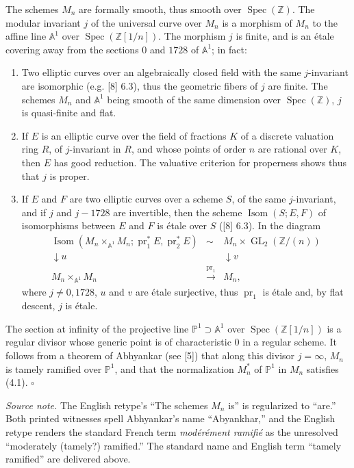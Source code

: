 \documentclass[10pt]{article}
\newcommand{\Z}{\mathbb Z}
\newcommand{\GL}{\operatorname{GL}}
\newcommand{\Isom}{\operatorname{Isom}}
\newcommand{\Spec}{\operatorname{Spec}}
\newcommand{\QED}{\hfill$\square$}
\begin{document}
The schemes $M_n$ are formally smooth, thus smooth over $\Spec(\Z)$. The modular invariant $j$ of the universal curve over $M_n$ is a morphism of $M_n$ to the affine line $\mathbb A^1$ over $\Spec(\Z[1/n])$. The morphism $j$ is finite, and is an étale covering away from the sections $0$ and $1728$ of $\mathbb A^1$; in fact:
\begin{enumerate}[label=(\alph*)]
\item Two elliptic curves over an algebraically closed field with the same $j$-invariant are isomorphic (e.g. [8] 6.3), thus the geometric fibers of $j$ are finite. The schemes $M_n$ and $\mathbb A^1$ being smooth of the same dimension over $\Spec(\Z)$, $j$ is quasi-finite and flat.
\item If $E$ is an elliptic curve over the field of fractions $K$ of a discrete valuation ring $R$, of $j$-invariant in $R$, and whose points of order $n$ are rational over $K$, then $E$ has good reduction. The valuative criterion for properness shows thus that $j$ is proper.
\item If $E$ and $F$ are two elliptic curves over a scheme $S$, of the same $j$-invariant, and if $j$ and $j-1728$ are invertible, then the scheme $\Isom(S;E,F)$ of isomorphisms between $E$ and $F$ is étale over $S$ ([8] 6.3). In the diagram
\[
\begin{array}{ccc}
\Isom(M_n\times_{\mathbb A^1}M_n;\operatorname{pr}_1^*E,\operatorname{pr}_2^*E) & \sim & M_n\times \GL_2(\Z/(n))\\
\downarrow u && \downarrow v\\
M_n\times_{\mathbb A^1}M_n&\xrightarrow{\operatorname{pr}_1}&M_n,
\end{array}
\]
where $j\ne 0,1728$, $u$ and $v$ are étale surjective, thus $\operatorname{pr}_1$ is étale and, by flat descent, $j$ is étale.
\end{enumerate}
The section at infinity of the projective line $\mathbb P^1\supset \mathbb A^1$ over $\Spec(\Z[1/n])$ is a regular divisor whose generic point is of characteristic $0$ in a regular scheme. It follows from a theorem of Abhyankar (see [5]) that along this divisor $j=\infty$, $M_n$ is tamely ramified over $\mathbb P^1$, and that the normalization $M_n^*$ of $\mathbb P^1$ in $M_n$ satisfies (4.1). \QED

\noindent\emph{Source note.} The English retype's ``The schemes $M_n$ is'' is regularized to ``are.'' Both printed witnesses spell Abhyankar's name ``Abyankhar,'' and the English retype renders the standard French term \emph{modérément ramifié} as the unresolved ``moderately (tamely?) ramified.'' The standard name and English term ``tamely ramified'' are delivered above.
\end{document}
